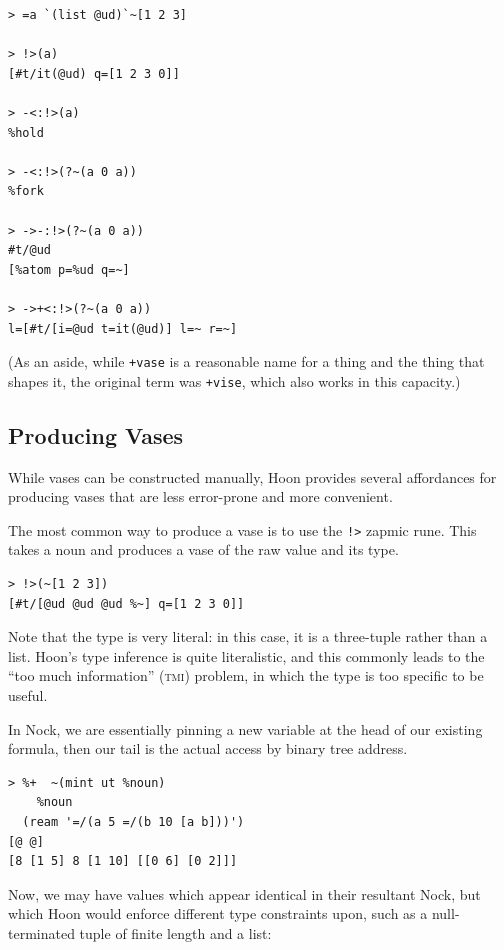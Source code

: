 \documentclass[twoside]{article}
\begin{document}
\begin{lstlisting}[style=listingcode]
> =a `(list @ud)`~[1 2 3]

> !>(a)
[#t/it(@ud) q=[1 2 3 0]]

> -<:!>(a)
%hold

> -<:!>(?~(a 0 a))
%fork

> ->-:!>(?~(a 0 a))
#t/@ud
[%atom p=%ud q=~]

> ->+<:!>(?~(a 0 a))
l=[#t/[i=@ud t=it(@ud)] l=~ r=~]
\end{lstlisting}

(As an aside, while \lstinline[style=inlinecode]{+vase} is a reasonable name for a thing and the thing that shapes it, the original term was \lstinline[style=inlinecode]{+vise}, which also works in this capacity.)

\subsection{Producing Vases}

While vases can be constructed manually, Hoon provides several affordances for producing vases that are less error-prone and more convenient.

The most common way to produce a vase is to use the \lstinline[style=inlinecode]{!>} zapmic rune.  This takes a noun and produces a vase of the raw value and its type.

\begin{lstlisting}[style=listingcode]
> !>(~[1 2 3])
[#t/[@ud @ud @ud %~] q=[1 2 3 0]]
\end{lstlisting}

\noindent
Note that the type is very literal:  in this case, it is a three-tuple rather than a list.  Hoon's type inference is quite literalistic, and this commonly leads to the ``too much information'' (\textsc{tmi}) problem, in which the type is too specific to be useful.

In Nock, we are essentially pinning a new variable at the head of our existing formula, then our tail is the actual access by binary tree address.

\begin{lstlisting}[style=listingcode]
> %+  ~(mint ut %noun)
    %noun
  (ream '=/(a 5 =/(b 10 [a b]))')
[@ @]
[8 [1 5] 8 [1 10] [[0 6] [0 2]]]
\end{lstlisting}

Now, we may have values which appear identical in their resultant Nock, but which Hoon would enforce different type constraints upon, such as a null-terminated tuple of finite length and a list:
\end{document}
